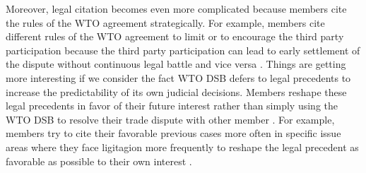 Moreover, legal citation becomes even more complicated because members cite the
rules of the WTO agreement strategically. For example,
members cite different rules of the WTO agreement to limit or to encourage
the third party participation because the third party
participation can lead to early settlement of the dispute without continuous
legal battle and vice versa  \cite{who_gets}. Things are getting more interesting if we consider the fact WTO DSB defers to legal precedents to increase the predictability of its own judicial decisions.
Members reshape these legal precedents in favor of their future interest rather than simply using the WTO DSB to resolve their trade dispute with other member \citep{pelc}.
For example, members try to cite their favorable previous cases more often in specific issue areas where they face ligitagion more frequently to reshape the legal precedent as favorable as possible to their own interest \citep{latent}.

